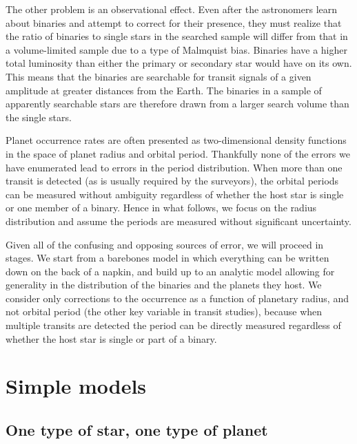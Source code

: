 \documentclass[12pt,modern]{aastex61}
\begin{document}
The other problem is an observational effect.  Even after the
astronomers learn about binaries and attempt to correct for their
presence, they must realize that the ratio of binaries to single stars
in the searched sample will differ from that in a volume-limited
sample due to a type of Malmquist bias.  Binaries have a higher total
luminosity than either the primary or secondary star would have on its
own.  This means that the binaries are searchable for transit signals
of a given amplitude at greater distances from the Earth.  The
binaries in a sample of apparently searchable stars are therefore
drawn from a larger search volume than the single stars.

Planet occurrence rates are often presented as two-dimensional density
functions in the space of planet radius and orbital period.
Thankfully none of the errors we have enumerated lead to errors in the
period distribution.  When more than one transit is detected (as is
usually required by the surveyors), the orbital periods can be
measured without ambiguity regardless of whether the host star is
single or one member of a binary.  Hence in what follows, we focus on
the radius distribution and assume the periods are measured without
significant uncertainty.

Given all of the confusing and opposing sources of error, we will
proceed in stages. We start from a barebones model in which everything
can be written down on the back of a napkin, and build up to an
analytic model allowing for generality in the distribution of the
binaries and the planets they host.  We consider only corrections to
the occurrence as a function of planetary radius, and not orbital
period (the other key variable in transit studies), because when
multiple transits are detected the period can be directly measured
regardless of whether the host star is single or part of a binary.



\section{Simple models}
\label{sec:simplest}

\subsection{One type of star, one type of planet}
\label{sec:model_1}
\end{document}
